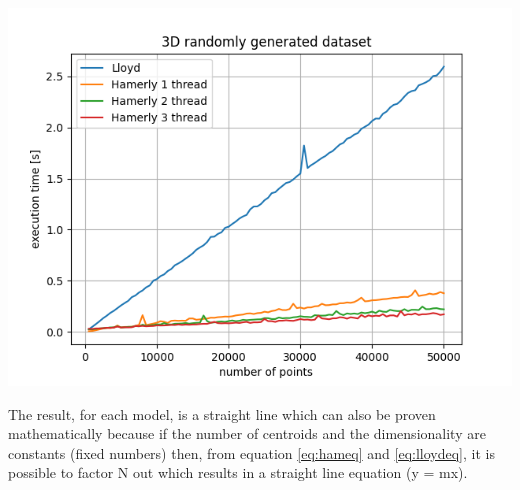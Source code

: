 \documentclass{report}
\begin{document}
\begin{minipage}[b]{0.48\textwidth}
  \begin{center} 
    \includegraphics[width = 1\textwidth]{imgs/lh123_3Drnd.png}
    \label{fig:lh123_3Drnd}
  \end{center}

  The result, for each model, is a straight line which can also be proven mathematically because if the number of centroids and the dimensionality are constants (fixed numbers) then, from equation \ref{eq:hameq} and \ref{eq:lloydeq}, it is possible to factor N out which results in a straight line equation (y = mx).

\end{minipage}
\hspace{0.1in}
\end{document}
